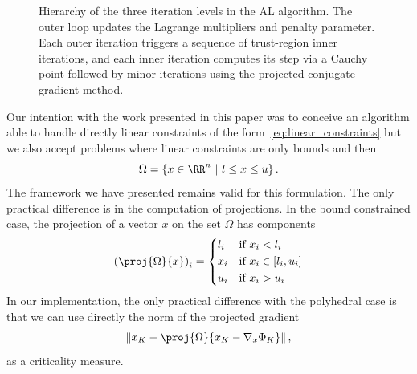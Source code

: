 \begin{figure}[ht]
	\caption{Hierarchy of the three iteration levels in the AL algorithm. The outer loop updates the Lagrange multipliers and penalty parameter. Each outer iteration triggers a sequence of trust-region inner iterations, and each inner iteration computes its step via a Cauchy point followed by minor iterations using the projected conjugate gradient method.}
	\label{fig:iteration_hierarchy}
\end{figure}
Our intention with the work presented in this paper was to conceive an algorithm able to handle directly linear constraints of the form~\eqref{eq:linear_constraints} but we also accept problems where linear constraints are only bounds and then
\[\Omega = \left\{x \in \RR^n \ |\ l \le x \le u\right\}.\]
The framework we have presented remains valid for this formulation. The only practical difference is in the computation of projections. In the bound constrained  case, the projection of a vector $x$ on the set $\Omega$ has components
\begin{equation}\label{eq:projection_bounds}
	\left(\proj{\Omega}{x}\right)_i = 
	\left\{ \begin{aligned}
		& l_i & &\text{if } x_i < l_i \\
		& x_i & &\text{if } x_i \in [l_i,u_i] \\
		& u_i & &\text{if } x_i > u_i
	\end{aligned} \right.
\end{equation}
In our implementation, the only practical difference with the polyhedral case is that we can use directly the norm of the projected gradient
\[\left\| x_K - \proj{\Omega}{x_K-\nabla_x\Phi_K}\right\|,\]
as a criticality measure.

